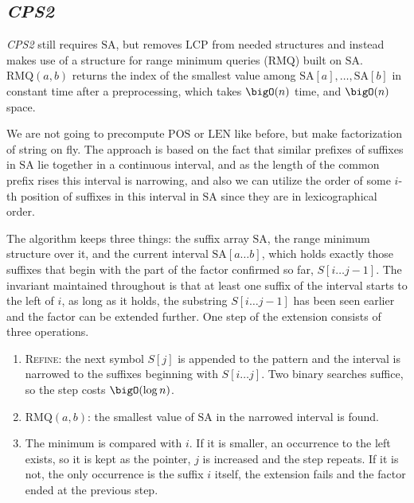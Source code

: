 \subsection{\emph{CPS2}}

\emph{CPS2} still requires \(\mathrm{SA}\), but removes \(\mathrm{LCP}\) from needed structures and instead makes use of a structure for range minimum queries (\(\mathrm{RMQ}\)) built on \(\mathrm{SA}\). \(\mathrm{RMQ}(a, b)\) returns the index of the smallest value among \(\mathrm{SA}[a], \ldots, \mathrm{SA}[b]\) in constant time after a preprocessing, which takes \(\bigO(n)\) time, and \(\bigO(n)\) space.

We are not going to precompute \(\mathrm{POS}\) or \(\mathrm{LEN}\) like before, but make factorization of string on fly. The approach is based on the fact that similar prefixes of suffixes in \(\mathrm{SA}\) lie together in a continuous interval, and as the length of the common prefix rises this interval is narrowing, and also we can utilize the order of some \(i\)-th position of suffixes in this interval in \(\mathrm{SA}\) since they are in lexicographical order. 

The algorithm keeps three things: the suffix array \(\mathrm{SA}\), the range minimum structure over it, and the current interval \(\mathrm{SA}[a \ldots b]\), which holds exactly those suffixes that begin with the part of the factor confirmed so far, \(S[i \ldots j-1]\). The invariant maintained throughout is that at least one suffix of the interval starts to the left of \(i\), as long as it holds, the substring \(S[i \ldots j-1]\) has been seen earlier and the factor can be extended further. One step of the extension consists of three operations.

\begin{enumerate}[label=(\arabic*)]
    \item \textsc{Refine}: the next symbol \(S[j]\) is appended to the pattern and the interval is narrowed to the suffixes beginning with \(S[i \ldots j]\). Two binary searches suffice, so the step costs \(\bigO(\log n)\).
    \item \(\mathrm{RMQ}(a, b)\): the smallest value of \(\mathrm{SA}\) in the narrowed interval is found.
    \item The minimum is compared with \(i\). If it is smaller, an occurrence to the left exists, so it is kept as the pointer, \(j\) is increased and the step repeats. If it is not, the only occurrence is the suffix \(i\) itself, the extension fails and the factor ended at the previous step.
\end{enumerate}

